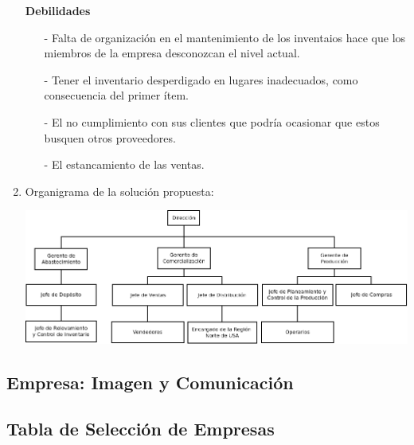 \documentclass[a4paper,10pt,titlepage]{article}
\begin{document}
\begin{enumerate}
    \textbf{Debilidades}  
 
  \begin{enumerate}
      \item[-] Falta de organización en el mantenimiento de los inventaios hace que los miembros de la empresa desconozcan el nivel actual. 
      \item[-] Tener el inventario desperdigado en lugares inadecuados, como consecuencia del primer ítem.
      \item[-] El no cumplimiento con sus clientes que podría ocasionar que estos busquen otros proveedores.
      \item[-] El estancamiento de las ventas.
  
   \end{enumerate} 
   
   \newpage
   
\item Organigrama de la soluci\'on propuesta:
\begin{center}
      \includegraphics[scale=0.34]{./Organigramas/Emporio2.png}
     \end{center}

\end{enumerate}

\newpage
\vspace*{\fill}
\begin{center}
\begingroup
\titlerule
\vspace{1cm}
\section{Empresa: Imagen y Comunicaci\'on}
\vspace{1cm}
\titlerule
\endgroup
\end{center}
\vspace*{\fill}

\newpage

\subsection{Tabla de Selecci\'on de Empresas}
\end{document}
